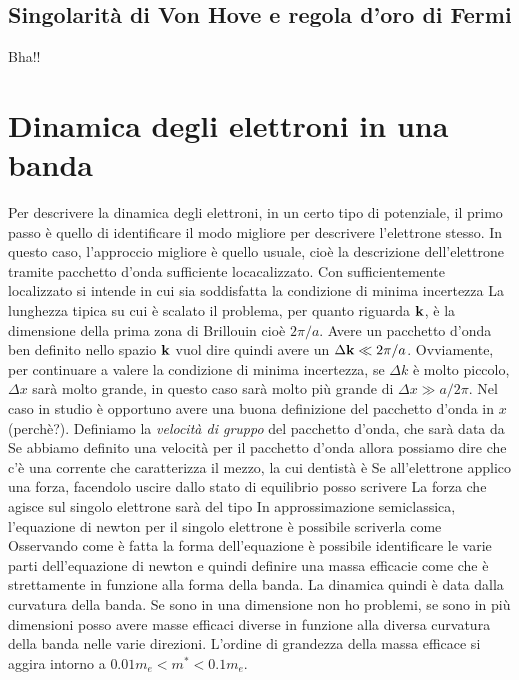 \documentclass[a4paper,12pt]{article}
\begin{document}
\subsection{Singolarità di Von Hove e regola d'oro di Fermi}
Bha!!
\section{Dinamica degli elettroni in una banda}
Per descrivere la dinamica degli elettroni, in un certo tipo di potenziale, il primo passo è quello di identificare il modo migliore per descrivere l'elettrone stesso. In questo caso, l'approccio migliore è quello usuale, cioè la descrizione dell'elettrone tramite pacchetto d'onda sufficiente locacalizzato. Con sufficientemente localizzato si intende 
in cui sia soddisfatta la condizione di minima incertezza
La lunghezza tipica su cui è scalato il problema, per quanto riguarda ${\it\bf k}$, è la dimensione della prima zona di Brillouin cioè $2\pi/a$. Avere un pacchetto d'onda ben definito nello spazio ${\it\bf k}$ vuol dire quindi avere un $\Delta {\it\bf k} \ll 2\pi/a$. Ovviamente, per continuare a valere la condizione di minima incertezza, se $\Delta k$ è molto piccolo, $\Delta x$ sarà molto grande, in questo caso sarà molto più grande di $\Delta x \gg a/2\pi$. Nel caso in studio è opportuno avere una buona definizione del pacchetto d'onda in $x$ (perchè?). Definiamo la \textit{velocità di gruppo} del pacchetto d'onda, che sarà data da
Se abbiamo definito una velocità per il pacchetto d'onda allora possiamo dire che c'è una corrente che caratterizza il mezzo, la cui dentistà è
Se all'elettrone applico una forza, facendolo uscire dallo stato di equilibrio posso scrivere
La forza che agisce sul singolo elettrone sarà del tipo
In approssimazione semiclassica, l'equazione di newton per il singolo elettrone è possibile scriverla come
Osservando come è fatta la forma dell'equazione è possibile identificare le varie parti dell'equazione di newton e quindi definire una massa efficacie come 
che è strettamente in funzione alla forma della banda. La dinamica quindi è data dalla curvatura della banda. Se sono in una dimensione non ho problemi, se sono in più dimensioni posso avere masse efficaci diverse in funzione alla diversa curvatura della banda nelle varie direzioni. L'ordine di grandezza della massa efficace si aggira intorno a $0.01 m_e < m^* < 0.1 m_e$.
\end{document}

